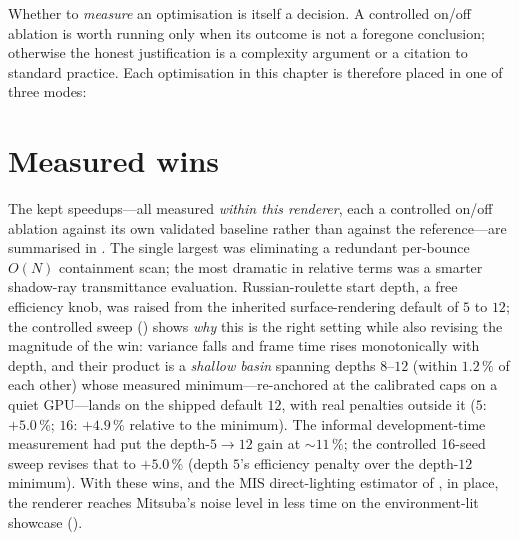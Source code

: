 Whether to \emph{measure} an optimisation is itself a decision. A controlled on/off ablation is worth
running only when its outcome is not a foregone conclusion; otherwise the honest justification is a
complexity argument or a citation to standard practice. Each optimisation in this chapter is therefore
placed in one of three modes:

\begin{table}[htp]
  \centering
  \caption{The three justification modes: the chapter measures what is informative, complexity-argues
  what is bounded, and cites the standard.}
  \label{tab:four-modes}
\end{table}

\section{Measured wins}
\label{sec:wins}

The kept speedups---all measured \emph{within this renderer}, each a controlled on/off ablation against
its own validated baseline rather than against the reference---are summarised in
. The single largest was eliminating a redundant per-bounce $O(N)$ containment scan;
the most dramatic in relative terms was a smarter shadow-ray transmittance evaluation. Russian-roulette
start depth, a free efficiency knob, was raised from the inherited surface-rendering default of $5$ to
$12$; the controlled sweep () shows \emph{why} this is the right setting while also
revising the magnitude of the win: variance falls and frame time rises monotonically with depth, and
their product is a \emph{shallow basin} spanning depths $8$--$12$ (within $1.2\,\%$ of each other) whose
measured minimum---re-anchored at the calibrated caps on a quiet GPU---lands on the shipped default
$12$, with real penalties outside it ($5$: $+5.0\,\%$; $16$: $+4.9\,\%$ relative to the minimum). The
informal development-time measurement had put the depth-$5\!\to\!12$ gain at ${\sim}11\,\%$; the
controlled \num{16}-seed sweep revises that to $+5.0\,\%$ (depth $5$'s efficiency penalty over the
depth-$12$ minimum). With these wins, and the MIS direct-lighting estimator of , in
place, the renderer reaches Mitsuba's noise level in less time on the environment-lit showcase
().

